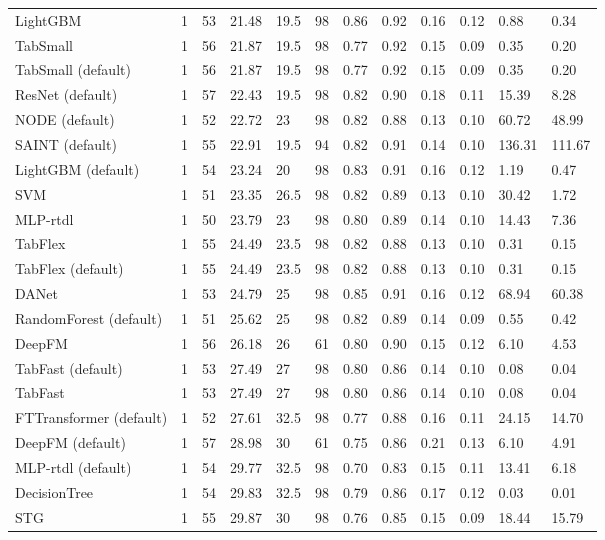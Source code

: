 \begin{tabular}{lllllrllllll}
LightGBM & 1 & 53 & 21.48 & 19.5 & 98 & 0.86 & 0.92 & 0.16 & 0.12 & 0.88 & 0.34 \\
TabSmall & 1 & 56 & 21.87 & 19.5 & 98 & 0.77 & 0.92 & 0.15 & 0.09 & 0.35 & 0.20 \\
TabSmall (default) & 1 & 56 & 21.87 & 19.5 & 98 & 0.77 & 0.92 & 0.15 & 0.09 & 0.35 & 0.20 \\
ResNet (default) & 1 & 57 & 22.43 & 19.5 & 98 & 0.82 & 0.90 & 0.18 & 0.11 & 15.39 & 8.28 \\
NODE (default) & 1 & 52 & 22.72 & 23 & 98 & 0.82 & 0.88 & 0.13 & 0.10 & 60.72 & 48.99 \\
SAINT (default) & 1 & 55 & 22.91 & 19.5 & 94 & 0.82 & 0.91 & 0.14 & 0.10 & 136.31 & 111.67 \\
LightGBM (default) & 1 & 54 & 23.24 & 20 & 98 & 0.83 & 0.91 & 0.16 & 0.12 & 1.19 & 0.47 \\
SVM & 1 & 51 & 23.35 & 26.5 & 98 & 0.82 & 0.89 & 0.13 & 0.10 & 30.42 & 1.72 \\
MLP-rtdl & 1 & 50 & 23.79 & 23 & 98 & 0.80 & 0.89 & 0.14 & 0.10 & 14.43 & 7.36 \\
TabFlex & 1 & 55 & 24.49 & 23.5 & 98 & 0.82 & 0.88 & 0.13 & 0.10 & 0.31 & 0.15 \\
TabFlex (default) & 1 & 55 & 24.49 & 23.5 & 98 & 0.82 & 0.88 & 0.13 & 0.10 & 0.31 & 0.15 \\
DANet & 1 & 53 & 24.79 & 25 & 98 & 0.85 & 0.91 & 0.16 & 0.12 & 68.94 & 60.38 \\
RandomForest (default) & 1 & 51 & 25.62 & 25 & 98 & 0.82 & 0.89 & 0.14 & 0.09 & 0.55 & 0.42 \\
DeepFM & 1 & 56 & 26.18 & 26 & 61 & 0.80 & 0.90 & 0.15 & 0.12 & 6.10 & 4.53 \\
TabFast (default) & 1 & 53 & 27.49 & 27 & 98 & 0.80 & 0.86 & 0.14 & 0.10 & 0.08 & 0.04 \\
TabFast & 1 & 53 & 27.49 & 27 & 98 & 0.80 & 0.86 & 0.14 & 0.10 & 0.08 & 0.04 \\
FTTransformer (default) & 1 & 52 & 27.61 & 32.5 & 98 & 0.77 & 0.88 & 0.16 & 0.11 & 24.15 & 14.70 \\
DeepFM (default) & 1 & 57 & 28.98 & 30 & 61 & 0.75 & 0.86 & 0.21 & 0.13 & 6.10 & 4.91 \\
MLP-rtdl (default) & 1 & 54 & 29.77 & 32.5 & 98 & 0.70 & 0.83 & 0.15 & 0.11 & 13.41 & 6.18 \\
DecisionTree & 1 & 54 & 29.83 & 32.5 & 98 & 0.79 & 0.86 & 0.17 & 0.12 & 0.03 & 0.01 \\
STG & 1 & 55 & 29.87 & 30 & 98 & 0.76 & 0.85 & 0.15 & 0.09 & 18.44 & 15.79 \\

\end{tabular}
